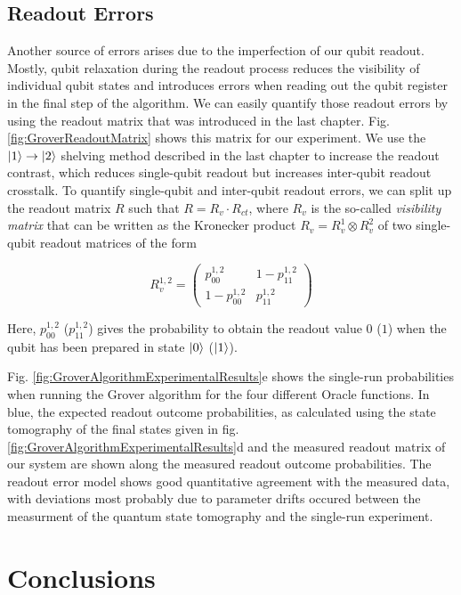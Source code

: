 \subsection{Readout Errors}

Another source of errors arises due to the imperfection of our qubit readout. Mostly, qubit relaxation during the readout process reduces the visibility of individual qubit states and introduces errors when reading out the qubit register in the final step of the algorithm. We can easily quantify those readout errors by using the readout matrix that was introduced in the last chapter. Fig. \ref{fig:GroverReadoutMatrix} shows this matrix for our experiment. We use the $\left| 1 \right>\to\left| 2 \right>$ shelving method described in the last chapter to increase the readout contrast, which reduces single-qubit readout but increases inter-qubit readout crosstalk. To quantify single-qubit and inter-qubit readout errors, we can split up the readout matrix $R$ such that $R=R_{v}\cdot R_{ct}$, where $R_{v}$ is the so-called {\it visibility matrix} that can be written as the Kronecker product $R_{v} = R_{v}^1 \otimes R_{v}^2$ of two single-qubit readout matrices of the form

\begin{equation}
R_{v}^{1,2} = \left(
			\begin{array}{cc}
				p_{00}^{1,2} & 1-p_{11}^{1,2} \\
				1-p_{00}^{1,2} & p_{11}^{1,2}
			\end{array}
		\right)
\end{equation}

Here, $p_{00}^{1,2}$ ($p_{11}^{1,2}$) gives the probability to obtain the readout value $0$ ($1$) when the qubit has been prepared in state $\left| 0 \right>$ ($\left| 1 \right>$).

\smallskip

Fig. \ref{fig:GroverAlgorithmExperimentalResults}e shows the single-run probabilities when running the Grover algorithm for the four different Oracle functions. In blue, the expected readout outcome probabilities, as calculated using the state tomography of the final states given in fig. \ref{fig:GroverAlgorithmExperimentalResults}d and the measured readout matrix of our system are shown along the measured readout outcome probabilities. The readout error model shows good quantitative agreement with the measured data, with deviations most probably due to parameter drifts occured between the measurment of the quantum state tomography and the single-run experiment.

\section{Conclusions}

